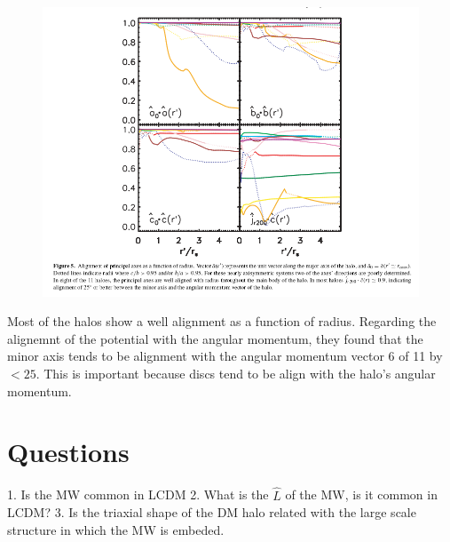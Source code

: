 \documentclass[12pt]{article}
\begin{document}
\begin{figure}
\includegraphics[scale=0.5]{alignmentH.png}
\end{figure}		

Most of the halos show a well alignment as a function of radius. 
Regarding the alignemnt of the potential with the angular momentum, they 
found that the minor axis tends to be alignment with the angular 
momentum vector 6 of 11 by $<25$. This is important because discs tend 
to be align with the halo's angular momentum. 



\section{Questions}

1. Is the MW common in LCDM
2. What is the $\hat{L}$ of the MW, is it common in LCDM?
3. Is the triaxial shape of the DM halo related with the large
scale structure in which the MW is embeded.
\end{document}

